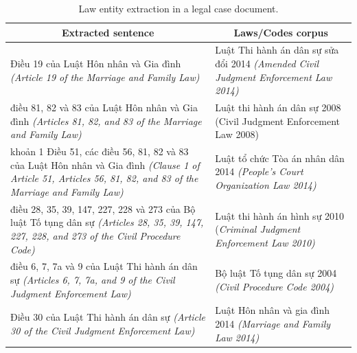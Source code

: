 \documentclass[conference]{IEEEtran}
\begin{document}
\begin{table}[ht]
\caption{Law entity extraction in a legal case document.}
\label{tab:law_ext}
\begin{tabular}{|p{4cm}|p{4cm}|}
\hline
\multicolumn{1}{|c|}{\textbf{Extracted sentence}} & \multicolumn{1}{c|}{\textbf{Laws/Codes corpus}} \\ \hline
Điều 19 của Luật Hôn nhân và Gia đình \textit{(Article 19 of the Marriage and Family Law) }                                  & Luật Thi hành án dân sự sửa đổi 2014 \textit{(Amended Civil Judgment Enforcement Law 2014)}     \\ \hline
điều 81, 82 và 83 của Luật Hôn nhân và Gia đình \textit{(Articles 81, 82, and 83 of the Marriage and Family Law)}                          & Luật thi hành án dân sự 2008 (Civil Judgment Enforcement Law 2008)             \\ \hline
khoản 1 Điều 51, các điều 56, 81, 82 và 83 của Luật Hôn nhân và Gia đình \textit{(Clause 1 of Article 51, Articles 56, 81, 82, and 83 of the Marriage and Family Law)} & Luật tổ chức Tòa án nhân dân 2014 \textit{(People's Court Organization Law 2014)}        \\ \hline
điều 28, 35, 39, 147, 227, 228 và 273 của Bộ luật Tố tụng dân sự \textit{(Articles 28, 35, 39, 147, 227, 228, and 273 of the Civil Procedure Code) }        & Luật thi hành án hình sự 2010 (\textit{Criminal Judgment Enforcement Law 2010)}           \\ \hline
điều 6, 7, 7a và 9 của Luật Thi hành án dân sự \textit{(Articles 6, 7, 7a, and 9 of the Civil Judgment Enforcement Law)}                          & Bộ luật Tố tụng dân sự 2004  \textit{(Civil Procedure Code 2004)   }         \\ \hline
Điều 30 của Luật Thi hành án dân sự \textit{(Article 30 of the Civil Judgment Enforcement Law)}                                      & Luật Hôn nhân và gia đình 2014 \textit{(Marriage and Family Law 2014)}           \\ \hline
\end{tabular}
\end{table}
 

\end{document}
